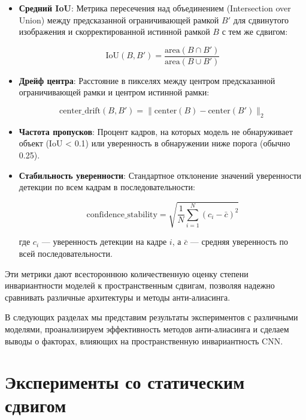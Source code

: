 \begin{itemize}
    \item \textbf{Средний IoU}: Метрика пересечения над объединением (Intersection over Union) между предсказанной ограничивающей рамкой $B'$ для сдвинутого изображения и скорректированной истинной рамкой $B$ с тем же сдвигом:
    
    \begin{equation}
    \text{IoU}(B, B') = \frac{\text{area}(B \cap B')}{\text{area}(B \cup B')}
    \end{equation}
    
    \item \textbf{Дрейф центра}: Расстояние в пикселях между центром предсказанной ограничивающей рамки и центром истинной рамки:
    
    \begin{equation}
    \text{center\_drift}(B, B') = \|\text{center}(B) - \text{center}(B')\|_2
    \end{equation}
    
    \item \textbf{Частота пропусков}: Процент кадров, на которых модель не обнаруживает объект (IoU < 0.1) или уверенность в обнаружении ниже порога (обычно 0.25).
    
    \item \textbf{Стабильность уверенности}: Стандартное отклонение значений уверенности детекции по всем кадрам в последовательности:
    
    \begin{equation}
    \text{confidence\_stability} = \sqrt{\frac{1}{N}\sum_{i=1}^{N}(c_i - \bar{c})^2}
    \end{equation}
    
    где $c_i$ — уверенность детекции на кадре $i$, а $\bar{c}$ — средняя уверенность по всей последовательности.
\end{itemize}

Эти метрики дают всестороннюю количественную оценку степени инвариантности моделей к пространственным сдвигам, позволяя надежно сравнивать различные архитектуры и методы анти-алиасинга.

В следующих разделах мы представим результаты экспериментов с различными моделями, проанализируем эффективность методов анти-алиасинга и сделаем выводы о факторах, влияющих на пространственную инвариантность CNN. 

\section{Эксперименты со статическим сдвигом}
\label{experiments:static}

